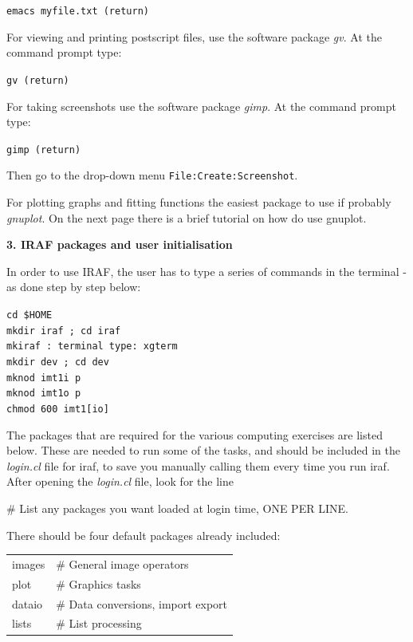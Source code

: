 \documentclass[12pt]{article}
\begin{document}
{\tt emacs myfile.txt (return)}         

For viewing and printing postscript files, use the software package
{\it gv}. At the command prompt type:

{\tt gv (return)}

For taking screenshots use the software package {\it gimp}. At the command prompt type:

{\tt gimp (return)}

Then go to the drop-down menu {\tt File:Create:Screenshot}.

For plotting graphs and fitting functions the easiest package to use
if probably {\it gnuplot}. On the next page there is a brief tutorial
on how do use gnuplot.\\

\newpage
\begin{center}
{\large{\bf 3. IRAF packages and user initialisation}}
\end{center}
In order to use IRAF, the user has to type a series of commands in the terminal - as done step by step below:

{\tt cd \$HOME}\\
{\tt mkdir iraf ; cd iraf}\\
{\tt mkiraf : terminal type: xgterm}\\
{\tt mkdir dev ; cd dev}\\
{\tt mknod imt1i p}\\
{\tt mknod imt1o p}\\
{\tt chmod 600 imt1[io]}

The packages that are required for the various computing exercises are listed below.  These are needed to run some of the tasks, and should be included in the {\it login.cl} file for {\sc iraf}, to save you manually calling them every time you run {\sc iraf}. After opening the {\it login.cl} file, look for the line 

{\sc \# List any packages you want loaded at login time, ONE PER LINE.}

There should be four default packages already included:

\begin{tabular}{ll}
{\sc images}          &\# General image operators\\
{\sc plot}            &\# Graphics tasks\\
{\sc dataio}          &\# Data conversions, import export\\
{\sc lists}           &\# List processing
\end{tabular}
\end{document}
